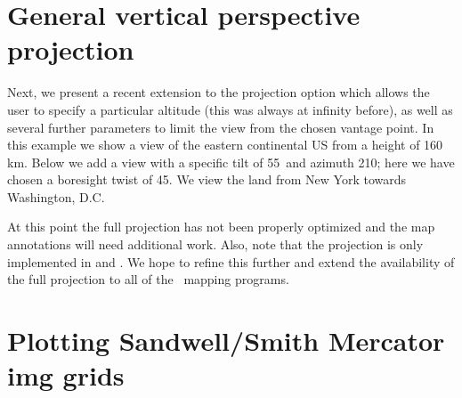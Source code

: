 
\section{General vertical perspective projection}

Next, we present a recent extension to the  projection option which allows the user
to specify a particular altitude (this was always at infinity before), as well as several
further parameters to limit the view from the chosen vantage point.  In this example we show
a view of the eastern continental US from a height of 160 km.  Below we add a view with a specific tilt of
55\DS\ and azimuth 210\DS; here we have chosen a boresight twist of 45\DS.  We view the land from
New York towards Washington, D.C.


At this point the full projection has not been properly optimized and the map annotations will need
additional work.  Also, note that the projection is only implemented in  and .
We hope to refine this further and extend the availability of the full projection to all of the
\GMT\ mapping programs.

 

\section{Plotting Sandwell/Smith Mercator img grids}

